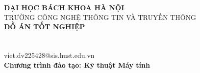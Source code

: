\documentclass[DoAn.tex]{subfiles}
\begin{document}
\begin{titlepage}
\thispagestyle{empty}
\begin{center}

{\textbf{\large{ĐẠI HỌC BÁCH KHOA HÀ NỘI}}}\\
{\large{TRƯỜNG CÔNG NGHỆ THÔNG TIN VÀ TRUYỀN THÔNG}}\\[4cm]

{\textbf{\huge{ĐỒ ÁN TỐT NGHIỆP}}}\\[1cm]
{\textbf{\Large{\TenDeTai}}}\\[1cm]

{\textbf{\large{\AUTHOR}}}\\
{\large{viet.dv225428@sis.hust.edu.vn}}\\[0.5cm]

{\textbf{\large{Chương trình đào tạo: Kỹ thuật Máy tính}}}\\

\vspace{3cm}
\begin{table}[H]
\centering
{}
\end{table}
\end{center}
\end{titlepage}
\end{document}
